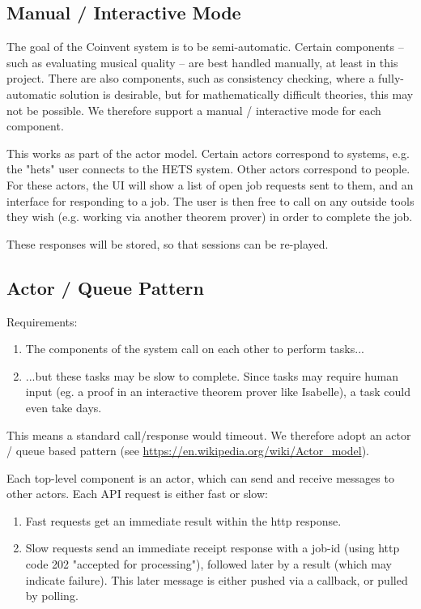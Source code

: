 \documentclass[10pt]{article}
\begin{document}
\subsection{Manual / Interactive Mode}

The goal of the Coinvent system is to be semi-automatic. 
Certain components -- such as evaluating musical quality -- are best handled manually, at least
in this project. There are also components, such as consistency checking, where a fully-automatic solution is desirable, but for mathematically difficult theories, this may not be possible.
We therefore support a manual / interactive mode for each component.

This works as part of the actor model. Certain actors correspond to systems, e.g. the "hets" user
connects to the HETS system. Other actors correspond to people. For these actors, the UI
will show a list of open job requests sent to them, and an interface for responding to a job.
The user is then free to call on any outside tools they wish (e.g. working via another theorem prover)
in order to complete the job.

These responses will be stored, so that sessions can be re-played.

\subsection{Actor / Queue Pattern}


Requirements:  
\begin{enumerate}
\item The components of the system call on each other to perform tasks...
\item ...but these tasks may be slow to complete. Since tasks may require human input (eg. a proof in an interactive theorem prover like Isabelle), a task
could even take days.
\end{enumerate}
This means a standard call/response would timeout. We therefore adopt an actor / queue based pattern (see \url{https://en.wikipedia.org/wiki/Actor_model}). 

Each top-level component is an actor, which can send and receive messages to other actors. Each API request is either fast or slow:
\begin{enumerate}
 \item Fast requests get an immediate result within the http response.
 \item Slow requests send an immediate receipt response with a job-id (using http code 202 "accepted for processing"), followed later by a result (which may indicate failure). This later message is either pushed via a callback, or pulled by polling.
\end{enumerate}
\end{document}
